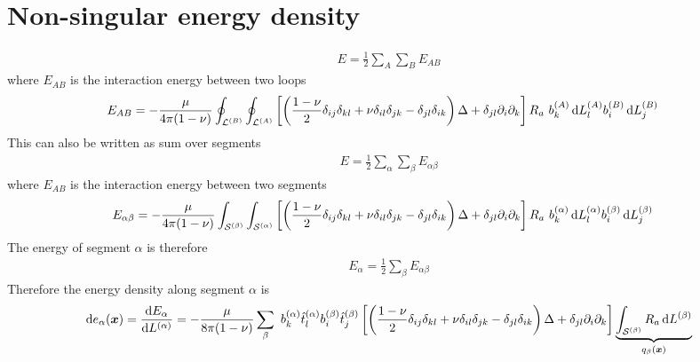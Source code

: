 \section{Non-singular energy density}
\begin{align}
E=\frac{1}{2}\sum_A\sum_BE_{AB}
\end{align}
where $E_{AB}$ is the interaction energy between two loops
\begin{align}
E_{AB}&=-\frac{\mu}{4\pi(1-\nu)}\oint_{\mathcal{L}^{(B)}}\oint_{\mathcal{L}^{(A)}}\left[\left(\frac{1-\nu}{2}\delta_{ij}\delta_{kl}+\nu\delta_{il}\delta_{jk}-\delta_{jl}\delta_{ik}\right)\Delta +\delta_{jl}\partial_i\partial_k\right]R_a\ b^{(A)}_{k}\, \text{d}L_l^{(A)} b_i^{(B)}\, \text{d}L_{j}^{(B)}
\label{interaction_energy_classical}
\end{align}
This can also be written as sum over segments
\begin{align}
E=\frac{1}{2}\sum_\alpha\sum_\beta E_{\alpha\beta}
\end{align}
where $E_{AB}$ is the interaction energy between two segments
\begin{align}
E_{\alpha\beta}&=-\frac{\mu}{4\pi(1-\nu)}\int_{\mathcal{S}^{(\beta)}}\int_{\mathcal{S}^{(\alpha)}}\left[\left(\frac{1-\nu}{2}\delta_{ij}\delta_{kl}+\nu\delta_{il}\delta_{jk}-\delta_{jl}\delta_{ik}\right)\Delta +\delta_{jl}\partial_i\partial_k\right]R_a\ b^{(\alpha)}_{k}\dL_l^{(\alpha)} b_i^{(\beta)}\dL_{j}^{(\beta)}
\label{interaction_energy_classical}
\end{align}
The energy of segment $\alpha$ is therefore
\begin{align}
E_\alpha=\frac{1}{2}\sum_\beta E_{\alpha\beta}
\end{align}
Therefore the energy density along segment $\alpha$ is
\begin{align}
\text{d}e_\alpha(\bm x)=\frac{\text{d} E_\alpha}{\text{d} L^{(\alpha)}}=-\frac{\mu}{8\pi(1-\nu)}\sum_\beta \ b^{(\alpha)}_{k} \hat{t}_l^{(\alpha)} b_i^{(\beta)} \hat{t}_j^{(\beta)}\left[\left(\frac{1-\nu}{2}\delta_{ij}\delta_{kl}+\nu\delta_{il}\delta_{jk}-\delta_{jl}\delta_{ik}\right)\Delta +\delta_{jl}\partial_i\partial_k\right]\underbrace{\int_{\mathcal{S}^{(\beta)}}R_a \, \text{d}L^{(\beta)}}_{q_\beta(\bm x)}
\end{align}

